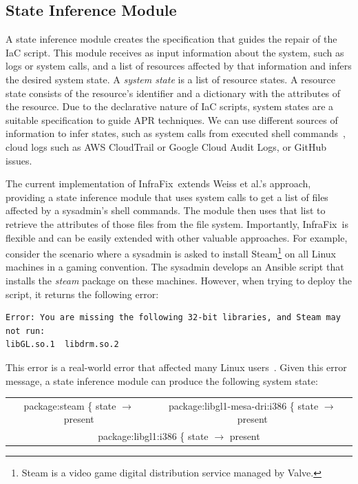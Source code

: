 \documentclass[sigconf,nonacm]{acmart}
\def\name{{\sc InfraFix}}
\begin{document}
\subsection{State Inference Module}
\label{sec:state_inference}

A state inference module creates the specification that guides the repair of the IaC script. This module receives as input information about the system, such as logs or system calls, and a list of resources affected by that information and infers the desired system state.
A \emph{system state} is a list of resource states. A resource state consists of the resource's identifier and a dictionary with the attributes of the resource. 
Due to the declarative nature of IaC scripts, system states are a suitable specification to guide APR techniques.
%
We can use different sources of information to infer states, such as system calls from executed shell commands~\cite{weiss2017tortoise}, cloud logs such as AWS CloudTrail or Google Cloud Audit Logs, or GitHub issues. %

The current implementation of \name\ extends Weiss et al.'s approach, providing a state inference module that uses system calls to get a list of files affected by a sysadmin's shell commands. The module then uses that list to retrieve the attributes of those files from the file system.
%
Importantly, \name\ is flexible and can be easily extended with other valuable approaches.
For example, consider the scenario where a sysadmin is asked to install Steam\footnote{Steam is a video game digital distribution service managed by Valve.} on all Linux machines in a gaming convention. The sysadmin develops an Ansible script that installs the \emph{steam} package on these machines. However, when trying to deploy the script, it returns the following error:

\begin{scriptsize}
\begin{verbatim}
Error: You are missing the following 32-bit libraries, and Steam may not run:
libGL.so.1  libdrm.so.2
\end{verbatim}
\end{scriptsize}

This error is a real-world error that affected many Linux users~\cite{steam_issue_2025}. Given this error message, a state inference module can produce the following system state:
\begin{center}
\begin{scriptsize}
\begin{tabular}{cc}
package:steam \{ state $\rightarrow$ present & package:libgl1-mesa-dri:i386 \{ state $\rightarrow$ present \\ \multicolumn{2}{c}{package:libgl1:i386 \{ state $\rightarrow$ present}\\
\end{tabular}
\end{scriptsize}   
\end{center}
\end{document}

